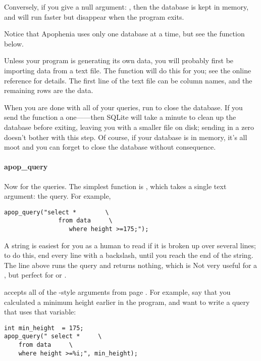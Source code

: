 Conversely, if you give a null argument: ,
then the database is kept in memory, and will run faster but 
disappear when the program exits.

Notice that Apophenia uses only one database at a time, but
see the  function below.

Unless your program is generating its own data, you will probably
first be importing data from a text file.  The 
function will do this for you; see the online reference for details. The
first line of the text file can be column names, and the remaining rows
are the data. 

When you are done with all of your queries, run
 to close the database. If you send the function a
one------then SQLite will take a minute to clean
up the database before exiting, leaving you with a smaller file on disk;
sending in a zero doesn't bother with this step. Of course, if your
database is in memory, it's all moot and you can forget to close the
database without consequence.


\paragraph{apop\_query} Now for the queries. The simplest function
is , which takes a single text argument: the
query. For example,
\setc
\begin{lstlisting}
apop_query("select *        \
               from data     \
                  where height >=175;");
\end{lstlisting}

A string is easiest for you as a human to read if it is
broken up over several lines; to do this, end every line with a
backslash, until you reach the end of the string. The line above runs
the query and returns nothing, which is Not very useful for a , but perfect for
\sinline{create} or \sinline{insert}.

 accepts all of the -style arguments from page \pageref{printf}. For example,
say that you calculated a minimum height earlier in the program, and want
to write a query that uses that variable:
\begin{lstlisting}
int min_height	= 175;
apop_query(" select *     \
    from data     \
    where height >=%i;", min_height);
\end{lstlisting}

